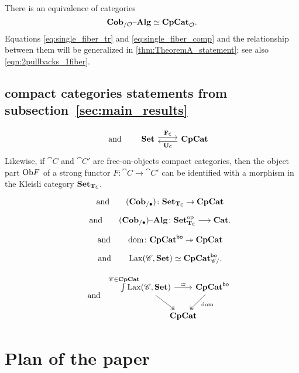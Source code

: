 \documentclass[11pt,oneside,article]{memoir}
\begin{document}
{There is an equivalence of categories
\begin{equation}
      \label{eq:single_fiber_comp}
   \mathbf{Cob}_{/\mathcal{O}}{\text \textendash}\mathbf{Alg}\simeq\mathbf{CpCat}_{\mathcal{O}}.
\end{equation}
Equations \eqref{eq:single_fiber_tr} and \eqref{eq:single_fiber_comp} and the relationship between
them will be generalized in \ref{thm:TheoremA_statement}; see also \eqref{eqn:2pullbacks_1fiber}.


\subsection{compact categories statements from subsection~\ref{sec:main_results}}

\[
   \qquad\text{and}\qquad
   \Adjoint{\Set}{\CompCat}{\FC}{\UC}
\]
 Likewise, if $\cat{C}$ and $\cat{C}'$ are free-on-objects compact categories, then the object part $\mathrm{Ob} F$ of a strong functor $F\colon\cat{C}\to\cat{C}'$ can be identified with a morphism in the Kleisli category $\mathbf{Set}_{\mathbf{T}_{\mathsf{C}}}$.

 \[\qquad\text{and}
   \qquad
   (\mathbf{Cob}_{/\bullet})\colon\mathbf{Set}_{\mathbf{T}_{\mathsf{C}}}\to\mathbf{CpCat}
\]

\begin{equation}
   \qquad\text{and}\qquad
   (\mathbf{Cob}_{/\bullet}){\text \textendash}\mathbf{Alg}\colon\mathbf{Set}_{\mathbf{T}_{\mathsf{C}}}^{\mathrm{op}}\longrightarrow\mathbf{Cat}.
\end{equation}

\[
   \qquad\text{and}\qquad
   \operatorname{dom}\colon\mathbf{CpCat}^{\mathsf{bo}}\twoheadrightarrow\mathbf{CpCat}
\]

\begin{equation}
   \qquad\text{and}\qquad
   \operatorname{Lax}(\mathscr{C},\mathbf{Set})\simeq\mathbf{CpCat}^{\mathsf{bo}}_{\mathscr{C}/}.
\end{equation}

\begin{equation*}
      \qquad\text{and}\qquad
      \begin{tikzcd}[column sep=-1em]
         \int\limits^{\mathclap{\cat{C}\in\CompCat}} \Lax(\cat{C},\Set)
               \ar[rr,"\equiv"] \ar[dr,two heads]
            && \CompCat^{\bo} \ar[dl,two heads,"\dom" pos=.4] \\
         & \CompCat &
      \end{tikzcd}
\end{equation*}

}%


\section{Plan of the paper}
\end{document}
